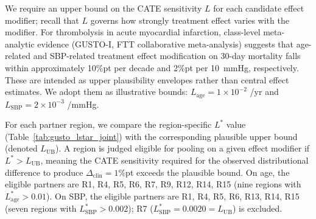 \documentclass[AMA,Times1COL]{WileyNJDv5}
\begin{document}
We require an upper bound on the CATE sensitivity $L$ for each candidate effect modifier; recall that $L$ governs how strongly treatment effect varies with the modifier. For thrombolysis in acute myocardial infarction, class-level meta-analytic evidence (GUSTO-I,\cite{gusto1993} FTT collaborative meta-analysis\cite{ftt1994}) suggests that age-related and SBP-related treatment effect modification on 30-day mortality falls within approximately 10\%pt per decade and 2\%pt per 10~mmHg, respectively. These are intended as upper plausibility envelopes rather than central effect estimates. We adopt them as illustrative bounds: $L_{\text{age}} = 1\times10^{-2}$ /yr and $L_{\text{SBP}} = 2\times10^{-3}$ /mmHg.

For each partner region, we compare the region-specific $L^*$ value (Table~\ref{tab:gusto_lstar_joint}) with the corresponding plausible upper bound (denoted $L_{\text{UB}}$). A region is judged eligible for pooling on a given effect modifier if $L^* > L_{\text{UB}}$, meaning the CATE sensitivity required for the observed distributional difference to produce $\Delta_{\text{clin}} = 1$\%pt exceeds the plausible bound. On age, the eligible partners are R1, R4, R5, R6, R7, R9, R12, R14, R15 (nine regions with $L^*_{\text{age}} > 0.01$). On SBP, the eligible partners are R1, R4, R5, R6, R13, R14, R15 (seven regions with $L^*_{\text{SBP}} > 0.002$); R7 ($L^*_{\text{SBP}} = 0.0020 = L_{\text{UB}}$) is excluded.
\end{document}
